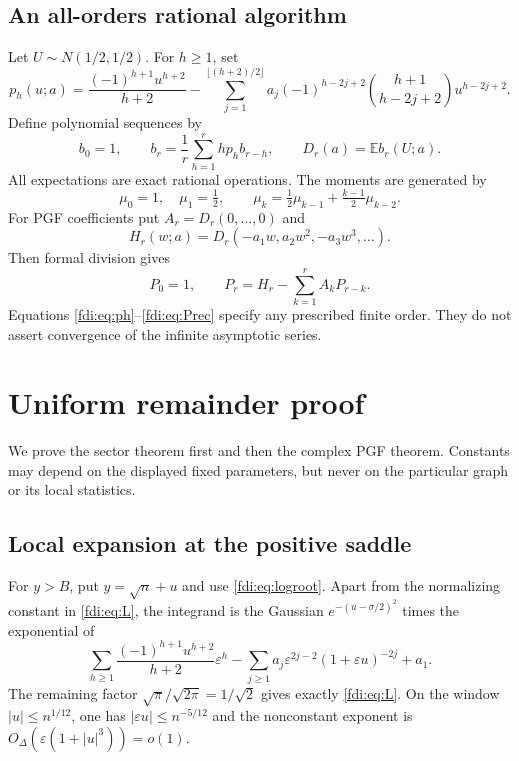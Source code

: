 \documentclass[11pt,letterpaper]{article}
\theoremstyle{remark}\newtheorem{remark}[theorem]{Remark}
\newcommand{\E}{\mathbb E}\newcommand{\Prb}{\mathbb P}\newcommand{\R}{\mathbb R}\newcommand{\C}{\mathbb C}
\newcommand{\eps}{\varepsilon}\newcommand{\Pois}{\operatorname{Poisson}}
\begin{document}
\subsection{An all-orders rational algorithm}
Let $U\sim N(1/2,1/2)$. For $h\ge1$, set
\begin{equation}\label{fdi:eq:ph}
 p_h(u;a)=\frac{(-1)^{h+1}u^{h+2}}{h+2}
 -\sum_{j=1}^{\lfloor(h+2)/2\rfloor}
 a_j(-1)^{h-2j+2}\binom{h+1}{h-2j+2}u^{h-2j+2}.
\end{equation}
Define polynomial sequences by
\begin{equation}\label{fdi:eq:brec}
 b_0=1,\qquad b_r=\frac1r\sum_{h=1}^r h p_h b_{r-h},
 \qquad D_r(a)=\E b_r(U;a).
\end{equation}
All expectations are exact rational operations. The moments are generated by
\[
 \mu_0=1,\quad\mu_1=\tfrac12,\qquad
 \mu_k=\tfrac12\mu_{k-1}+\tfrac{k-1}{2}\mu_{k-2}.
\]
For PGF coefficients put $A_r=D_r(0,\ldots,0)$ and
\[
 H_r(w;a)=D_r(-a_1w,a_2w^2,-a_3w^3,\ldots).
\]
Then formal division gives
\begin{equation}\label{fdi:eq:Prec}
 P_0=1,\qquad P_r=H_r-\sum_{k=1}^r A_kP_{r-k}.
\end{equation}
Equations \eqref{fdi:eq:ph}--\eqref{fdi:eq:Prec} specify any prescribed finite order. They do not assert convergence of the infinite asymptotic series.

\section{Uniform remainder proof}
We prove the sector theorem first and then the complex PGF theorem. Constants may depend on the displayed fixed parameters, but never on the particular graph or its local statistics.

\subsection{Local expansion at the positive saddle}
For $y>B$, put $y=\sqrt n+u$ and use \eqref{fdi:eq:logroot}. Apart from the normalizing constant in \eqref{fdi:eq:L}, the integrand is the Gaussian $e^{-(u-\sigma/2)^2}$ times the exponential of
\begin{equation}\label{fdi:eq:exponent}
 \sum_{h\ge1}\frac{(-1)^{h+1}u^{h+2}}{h+2}\eps^h
 -\sum_{j\ge1}a_j\eps^{2j-2}(1+\eps u)^{-2j}+a_1.
\end{equation}
The remaining factor $\sqrt\pi/\sqrt{2\pi}=1/\sqrt2$ gives exactly \eqref{fdi:eq:L}. On the window $|u|\le n^{1/12}$, one has $|\eps u|\le n^{-5/12}$ and the nonconstant exponent is $O_\Delta(\eps(1+|u|^3))=o(1)$.
\end{document}
